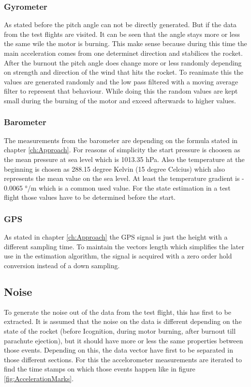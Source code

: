 \subsubsection{Gyrometer}
As stated before the pitch angle can not be directly generated.
But if the  data from the test flights are visited. It can be seen that the angle stays more or less the same wile the motor is burning.
This make sense because during this time the main acceleration comes from one determinet direction and stabilices the rocket.
After the burnout the pitch angle does change more or less randomly depending on strength and direction of the wind that hits the rocket.
To reanimate this the values are generated randomly and the low pass filtered with a moving average filter to represent that behaviour.
While doing this the random values are kept small during the burning of the motor and exceed afterwards to higher values.

\subsubsection{Barometer}
The measurements from the barometer are depending on the formula stated in chapter \ref{ch:Approach}.
For reasons of simplicity the start pressure is choosen as the mean pressure at sea level which is 1013.35 hPa.
Also the temperature at the beginning is chosen as 288.15 degree Kelvin (15 degree Celcius) which also represents the mean value on the sea level.
At least the temperature gradient is - 0.0065 °/m which is a common used value.
For the state estimation in a test flight those values have to be determined before the start.

\subsubsection{GPS}
As stated in chapter \ref{ch:Approach} the GPS signal is just the height with a different sampling time. 
To maintain the vectors length which simplifies the later use in the estimation algorithm,
the signal is acquired with a zero order hold conversion instead of a down sampling. 


\subsection{Noise}
To generate the noise out of the data from the test flight, this has first to be extracted.
It is assumed that the noise on the data is different depending on the state of the rocket (before Icognition, during motor burning, after burnout till parachute ejection),
but it should have more or less the same properties between those events.
Depending on this, the data vector have first to be separated in those different sections.
For this the accelorometer measurements are iterated to find the time stamps on which those events happen like in figure \ref{fig:AccelerationMarks}.

